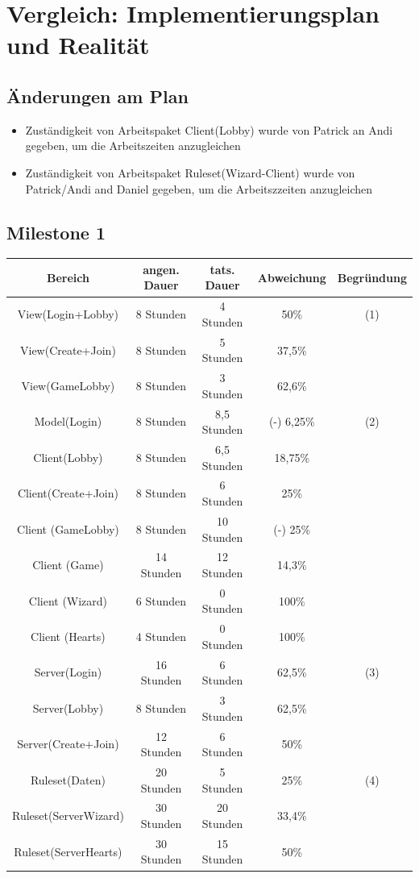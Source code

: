 \documentclass{article}
\begin{document}
\section{Vergleich: Implementierungsplan und Realität}

\subsection{Änderungen am Plan}
\begin{itemize}
\item Zuständigkeit von Arbeitspaket Client(Lobby) wurde von Patrick an Andi gegeben, um die Arbeitszeiten anzugleichen
\item Zuständigkeit von Arbeitspaket Ruleset(Wizard-Client) wurde von Patrick/Andi and Daniel gegeben, um die Arbeitszzeiten anzugleichen
\end{itemize}

\subsection{Milestone 1}

\begin{tabular}{|c|c|c|c|c|}\hline
   Bereich & angen. Dauer & tats. Dauer & Abweichung & Begründung \\ \hline\hline
   View(Login+Lobby) & 8 Stunden & 4 Stunden & 50\% & (1) \\ \hline
   View(Create+Join) & 8 Stunden & 5 Stunden & 37,5\% &\\ \hline
   View(GameLobby) & 8 Stunden & 3 Stunden & 62,6\% &\\ \hline
   Model(Login) & 8 Stunden & 8,5 Stunden & (-) 6,25\% & (2) \\ \hline
   Client(Lobby) & 8 Stunden &  6,5 Stunden & 18,75\% &\\ \hline
   Client(Create+Join) &  8 Stunden & 6 Stunden & 25\% &\\ \hline
   Client (GameLobby) &  8 Stunden & 10 Stunden & (-) 25\% &\\ \hline
   Client (Game) & 14  Stunden &  12 Stunden & 14,3\% &\\ \hline
   Client (Wizard) & 6 Stunden & 0 Stunden & 100\% &\\ \hline
   Client (Hearts) & 4 Stunden & 0 Stunden & 100\% &\\ \hline
   Server(Login) & 16 Stunden & 6 Stunden & 62,5\% & (3) \\ \hline
   Server(Lobby) & 8 Stunden & 3 Stunden & 62,5\% &\\ \hline 
   Server(Create+Join) & 12 Stunden & 6 Stunden & 50\% &\\ \hline 
   Ruleset(Daten) & 20 Stunden & 5 Stunden & 25\% & (4) \\ \hline 
   Ruleset(ServerWizard) & 30 Stunden & 20 Stunden & 33,4\% &\\ \hline 
   Ruleset(ServerHearts) & 30 Stunden & 15 Stunden & 50\% &\\ \hline 
 \end{tabular}
\end{document}
